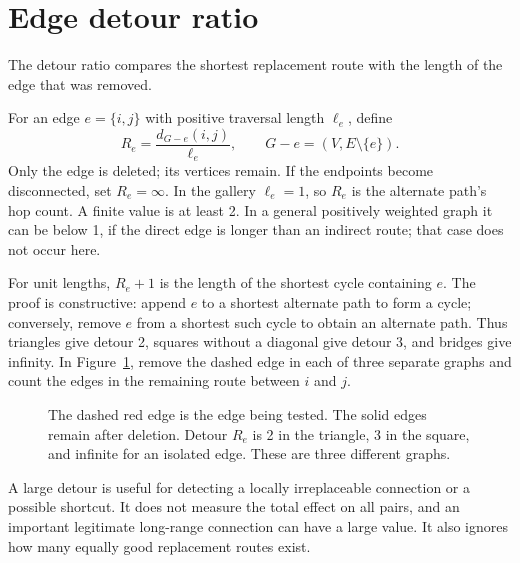 \documentclass[11pt]{article}
\newcommand{\plain}[1]{\noindent #1\par\smallskip}
\begin{document}
\clearpage
\section{Edge detour ratio}
\plain{The detour ratio compares the shortest replacement route with the length of the edge that was removed.}
For an edge $e=\{i,j\}$ with positive traversal length $\ell_e$, define
\begin{equation}
 R_e=\frac{d_{G-e}(i,j)}{\ell_e},\qquad G-e=(V,E\setminus\{e\}).
\end{equation}
Only the edge is deleted; its vertices remain. If the endpoints become disconnected, set $R_e=\infty$. In the gallery $\ell_e=1$, so $R_e$ is the alternate path's hop count. A finite value is at least 2. In a general positively weighted graph it can be below 1, if the direct edge is longer than an indirect route; that case does not occur here.

For unit lengths, $R_e+1$ is the length of the shortest cycle containing $e$. The proof is constructive: append $e$ to a shortest alternate path to form a cycle; conversely, remove $e$ from a shortest such cycle to obtain an alternate path. Thus triangles give detour 2, squares without a diagonal give detour 3, and bridges give infinity. In Figure~\ref{fig:detour}, remove the dashed edge in each of three separate graphs and count the edges in the remaining route between $i$ and $j$.
\par
\begin{figure}[H]\centering
{}
\caption{The dashed red edge is the edge being tested. The solid edges remain after deletion. Detour $R_e$ is 2 in the triangle, 3 in the square, and infinite for an isolated edge. These are three different graphs.}\label{fig:detour}
\end{figure}
\par
A large detour is useful for detecting a locally irreplaceable connection or a possible shortcut. It does not measure the total effect on all pairs, and an important legitimate long-range connection can have a large value. It also ignores how many equally good replacement routes exist.
\end{document}
